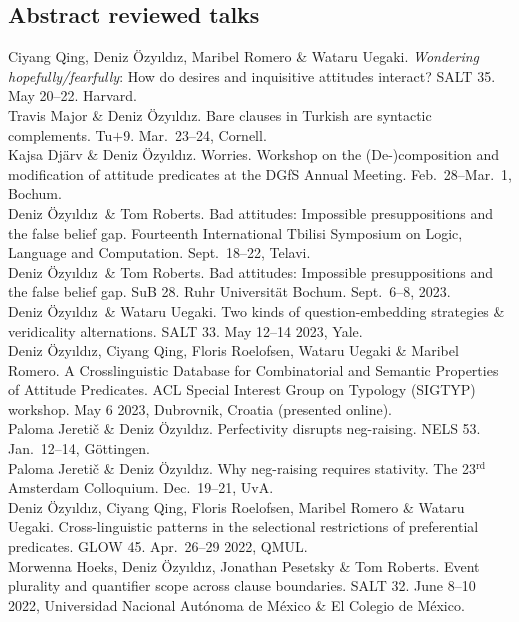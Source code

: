 \documentclass[11pt, a4paper]{article} %
\newcommand{\years}[1]{\marginnote{\scriptsize #1}} %
\newcommand{\me}{Deniz \"Ozy\i{}ld\i{}z}
\begin{document}
\subsection*{Abstract reviewed talks}
\years{2025} Ciyang Qing, \me, Maribel Romero \& Wataru Uegaki. \emph{Wondering
hopefully/fearfully}: How do desires and inquisitive attitudes interact? SALT
35. May 20--22. Harvard.\\[.25em]
\years{2024} Travis Major \& \me. Bare clauses in Turkish are syntactic
complements. Tu$+$9. Mar.\ 23--24, Cornell.\\[.25em]
Kajsa Dj\"arv \& \me. Worries. Workshop on the (De-)composition
and modification of attitude predicates at the DGfS Annual Meeting. Feb.\
28--Mar.\ 1, Bochum. \\[.25em]
\years{2023} \me\ \& Tom Roberts. Bad attitudes: Impossible presuppositions and
the false belief gap. Fourteenth International Tbilisi Symposium on Logic,
Language and Computation. Sept.\ 18--22, Telavi. \\ [.25em]
\me\ \& Tom Roberts. Bad attitudes: Impossible presuppositions and
the false belief gap. SuB 28. Ruhr Universit\"at Bochum. Sept.\ 6--8, 2023. \\[.25em]
\me\ \& Wataru Uegaki. Two kinds of question-embedding strategies \&
veridicality alternations. SALT 33. May 12--14 2023, Yale. \\[.25em]
\years{2023} Deniz \"Ozy\i{}ld\i{}z, Ciyang Qing, Floris Roelofsen, Wataru
Uegaki \& Maribel Romero. A Crosslinguistic Database for Combinatorial and
Semantic Properties of Attitude Predicates. ACL Special
Interest Group on Typology (SIGTYP) workshop. May 6 2023, Dubrov\-nik, Croatia
(presented online).\\[.25em]
\years{2023} Paloma Jereti\v{c} \& \me. Perfectivity disrupts neg-raising. NELS
53. Jan.\ 12--14, G\"ottingen. \\[.25em]
\years{2022} Paloma Jereti\v{c} \& \me. Why neg-raising requires stativity. The 23$^{\text{rd}}$ Amsterdam Colloquium. Dec.\ 19--21, UvA. \\[.25em]
Deniz \"Ozy\i{}ld\i{}z, Ciyang Qing, Floris Roelofsen, Maribel Romero \& Wataru Uegaki. Cross-linguistic patterns in the selectional restrictions of preferential predicates. GLOW 45. Apr.\ 26--29 2022, QMUL.\\[.25em]
Morwenna Hoeks, Deniz \"Ozy\i{}ld\i{}z, Jonathan Pesetsky \& Tom Roberts. Event plurality and quantiﬁer scope across clause boundaries. SALT 32. June 8--10 2022, Universidad Nacional Aut\'onoma de M\'exico \& El Colegio de M\'exico.\\[.25em]
\end{document}
